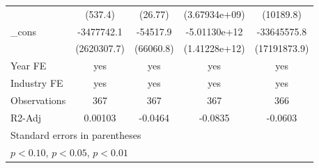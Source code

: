 \begin{table}[htbp]
\begin{tabular}{l*{4}{c}}
                    &     (537.4)         &     (26.77)         &(3.67934e+09)         &   (10189.8)         \\
\_cons              &  -3477742.1         &    -54517.9         &-5.01130e+12\sym{***}& -33645575.8\sym{*}  \\
                    & (2620307.7)         &   (66060.8)         &(1.41228e+12)         &(17191873.9)         \\
\hline
Year FE             &         yes         &         yes         &         yes         &         yes         \\
Industry FE         &         yes         &         yes         &         yes         &         yes         \\
Observations        &         367         &         367         &         367         &         366         \\
R2-Adj              &     0.00103         &     -0.0464         &     -0.0835         &     -0.0603         \\
\hline\hline
\multicolumn{5}{l}{\footnotesize Standard errors in parentheses}\\
\multicolumn{5}{l}{\footnotesize \sym{*} \(p<0.10\), \sym{**} \(p<0.05\), \sym{***} \(p<0.01\)}\\
\end{tabular}
\end{table}
